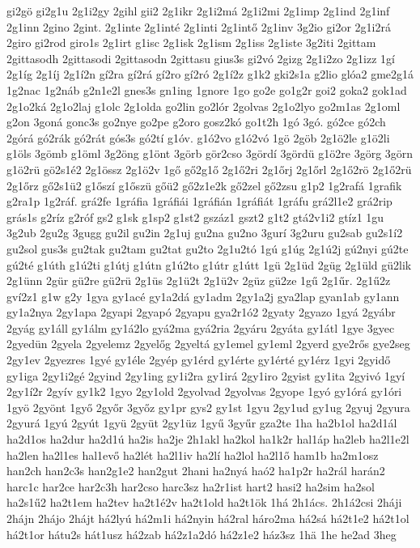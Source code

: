 {gi2gö
gi2g1u
2g1i2gy
2gihl
gii2
2g1ikr
2g1i2má
2g1i2mi
2g1imp
2g1ind
2g1inf
2g1inn
2gino
2gint.
2g1inte
2g1inté
2g1inti
2g1intő
2g1inv
3g2io
gi2or
2g1i2rá
2giro
gi2rod
giro1s
2g1irt
g1isc
2g1isk
2g1ism
2g1iss
2g1iste
3g2iti
2gittam
2gittasodh
2gittasodi
2gittasodn
2gittasu
gius3s
gi2vó
2gizg
2g1i2zo
2g1izz
1gí
2g1íg
2g1íj
2g1í2n
gí2ra
gí2rá
gí2ro
gí2ró
2g1í2z
g1k2
gki2s1a
g2lio
glóa2
gme2g1á
1g2nac
1g2náb
g2n1e2l
gnes3s
gn1ing
1gnore
1go
go2e
go1g2r
goi2
goka2
gok1ad
2g1o2ká
2g1o2laj
g1olc
2g1olda
go2lin
go2lór
2golvas
2g1o2lyo
go2m1as
2g1oml
g2on
3goná
gonc3s
go2nye
go2pe
g2oro
gosz2kó
go1t2h
1gó
3gó.
gó2ce
gó2ch
2górá
gó2rák
gó2rát
gós3s
gó2tí
g1óv.
g1ó2vo
g1ó2vó
1gö
2göb
2g1ö2le
g1ö2li
g1öls
3gömb
g1öml
3g2öng
g1önt
3görb
gör2cso
3gördí
3gördü
g1ö2re
3görg
3görn
g1ö2rü
gö2s1é2
2g1össz
2g1ö2v
1gő
gő2g1ő
2g1ő2ri
2g1őrj
2g1őrl
2g1ő2rö
2g1ő2rü
2g1őrz
gő2s1ü2
g1őszí
g1őszü
gőü2
gő2z1e2k
gő2zel
gő2zsu
g1p2
1g2rafá
1grafik
g2ra1p
1g2ráf.
grá2fe
1gráfia
1gráfiái
1gráfián
1gráfiát
1gráfu
grá2l1e2
grá2rip
grás1s
g2ríz
g2róf
gs2
g1sk
g1sp2
g1st2
gszáz1
gszt2
g1t2
gtá2v1i2
gtíz1
1gu
3g2ub
2gu2g
3gugg
gu2il
gu2in
2g1uj
gu2na
gu2no
3gurí
3g2uru
gu2sab
gu2s1í2
gu2sol
gus3s
gu2tak
gu2tam
gu2tat
gu2to
2g1u2tó
1gú
g1úg
2g1ú2j
gú2nyi
gú2te
gú2té
g1úth
g1ú2ti
g1útj
g1útn
g1ú2to
g1útr
g1útt
1gü
2g1üd
2güg
2g1üld
gü2lik
2g1ünn
2gür
gü2re
gü2rü
2g1üs
2g1ü2t
2g1ü2v
2güz
gü2ze
1gű
2g1űr.
2g1ű2z
gví2z1
g1w
g2y
1gya
gy1acé
gy1a2dá
gy1adm
2gy1a2j
gya2lap
gyan1ab
gy1ann
gy1a2nya
2gy1apa
2gyapi
2gyapó
2gyapu
gya2r1ó2
2gyaty
2gyazo
1gyá
2gyábr
2gyág
gy1áll
gy1álm
gy1á2lo
gyá2ma
gyá2ria
2gyáru
2gyáta
gy1átl
1gye
3gyec
2gyedün
2gyela
2gyelemz
2gyelőg
2gyeltá
gy1emel
gy1eml
2gyerd
gye2rős
gye2seg
2gy1ev
2gyezres
1gyé
gy1éle
2gyép
gy1érd
gy1érte
gy1érté
gy1érz
1gyi
2gyidő
gy1iga
2gy1i2gé
2gyind
2gy1ing
gy1i2ra
gy1irá
2gy1iro
2gyist
gy1ita
2gyivó
1gyí
2gy1í2r
2gyív
gy1k2
1gyo
2gy1old
2gyolvad
2gyolvas
2gyope
1gyó
gy1órá
gy1óri
1gyö
2gyönt
1győ
2győr
3győz
gy1pr
gys2
gy1st
1gyu
2gy1ud
gy1ug
2gyuj
2gyura
2gyurá
1gyú
2gyút
1gyü
2gyüt
2gy1üz
1gyű
3gyűr
gza2te
1ha
ha2b1ol
ha2d1ál
ha2d1os
ha2dur
ha2d1ú
ha2is
ha2je
2h1akl
ha2kol
ha1k2r
hal1áp
ha2leb
ha2l1e2l
ha2len
ha2l1es
hal1evő
ha2lét
ha2l1iv
ha2lí
ha2lol
ha2l1ő
ham1b
ha2m1osz
han2ch
han2c3s
han2g1e2
han2gut
2hani
ha2nyá
haó2
ha1p2r
ha2rál
harán2
harc1c
har2ce
har2c3h
har2cso
harc3sz
ha2r1ist
hart2
hasi2
ha2sim
ha2sol
ha2s1ű2
ha2t1em
ha2tev
ha2t1é2v
ha2t1old
ha2t1ök
1há
2h1ács.
2h1á2csi
2háji
2hájn
2hájo
2hájt
há2lyú
há2m1i
há2nyin
há2ral
háro2ma
há2sá
há2t1e2
há2t1ol
há2t1or
hátu2s
hát1usz
há2zab
há2z1a2dó
há2z1e2
ház3sz
1hä
1he
he2ad
3heg
}
